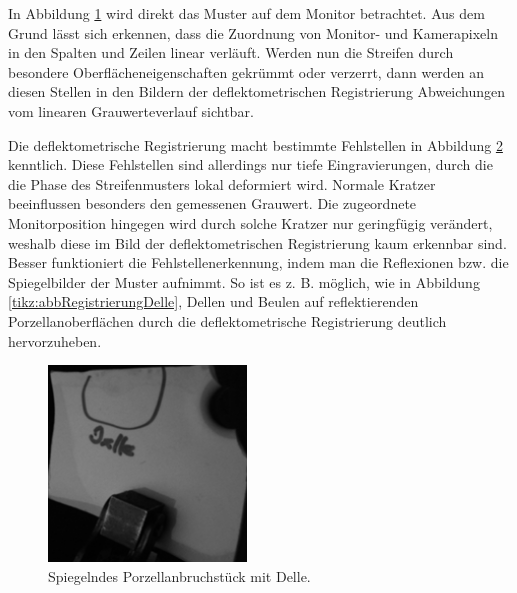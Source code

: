 {
	\begin{figure}[H]
		\centering
		
		\label{tikz:abbOptimaleSpaltenZeilenReg}
	\end{figure}
}

\noindent
In Abbildung \ref{tikz:abbOptimaleSpaltenZeilenReg} wird direkt das Muster auf dem Monitor betrachtet.
Aus dem Grund lässt sich erkennen, dass die Zuordnung von Monitor- und Kamerapixeln in den Spalten und Zeilen linear verläuft.
Werden nun die Streifen durch besondere Oberflächeneigenschaften gekrümmt oder verzerrt, dann werden an diesen Stellen in den Bildern der deflektometrischen Registrierung Abweichungen vom linearen Grauwerteverlauf sichtbar.

{
	\begin{figure}[H]
		\centering
		
		\label{tikz:abbBrillenglasRegistrierung}
	\end{figure}
}

\noindent
Die deflektometrische Registrierung macht bestimmte Fehlstellen in Abbildung \ref{tikz:abbBrillenglasRegistrierung} kenntlich.
Diese Fehlstellen sind allerdings nur tiefe Eingravierungen, durch die die Phase des Streifenmusters lokal deformiert wird.
Normale Kratzer beeinflussen besonders den gemessenen Grauwert.
Die zugeordnete Monitorposition hingegen wird durch solche Kratzer nur geringfügig verändert, weshalb diese im Bild der deflektometrischen Registrierung kaum erkennbar sind.
Besser funktioniert die Fehlstellenerkennung, indem man die Reflexionen bzw. die Spiegelbilder der Muster aufnimmt.
So ist es z. B. möglich, wie in Abbildung \ref{tikz:abbRegistrierungDelle}, Dellen und Beulen auf reflektierenden Porzellanoberflächen durch die deflektometrische Registrierung deutlich hervorzuheben.

{
	\begin{figure}[H]
		\centering
		\includegraphics[width = 0.47\textwidth]{04_deflektometrischeRegistrierung/auswertungDeflektometrischeRegistrierung/figures/delleBeleuchtet}
		\caption[Spiegelndes Porzellanbruchstück mit Delle]{Spiegelndes Porzellanbruchstück mit Delle.}
		\label{img:objektMitDelle}
	\end{figure}
}

